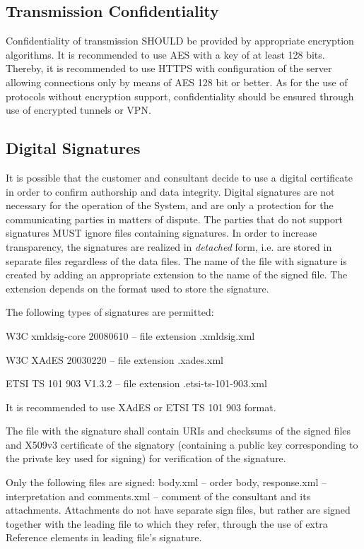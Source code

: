 \documentclass[a4paper]{article}
\begin{document}
\subsection{Transmission Confidentiality}

Confidentiality of transmission SHOULD be provided by appropriate encryption algorithms. 
It is recommended to use AES with a key of at least 128 bits. Thereby, it is recommended 
to use HTTPS with configuration of the server allowing connections only by means of AES 128 
bit or better. As for the use of protocols without encryption support, confidentiality 
should be ensured through use of encrypted tunnels or VPN.

\subsection{Digital Signatures}
\label{sec:sig}

It is possible that the customer and consultant decide to use a digital certificate in order 
to confirm authorship and data integrity. Digital signatures are not necessary for the operation 
of the System, and are only a protection for the communicating parties in matters of dispute. 
The parties that do not support signatures MUST ignore files containing signatures. In order 
to increase transparency, the signatures are realized in \emph{detached} form, i.e. are stored 
in separate files regardless of the data files. The name of the file with signature is created 
by adding an appropriate extension to the name of the signed file. The extension depends on 
the format used to store the signature.

The following types of signatures are permitted:
\begin{description}
\item W3C xmldsig-core 20080610 – file extension .xmldsig.xml
\item W3C XAdES 20030220 – file extension .xades.xml
\item ETSI TS 101 903 V1.3.2 – file extension .etsi-ts-101-903.xml      
\end{description}

It is recommended to use XAdES or ETSI TS 101 903 format.

The file with the signature shall contain URIs and checksums of the signed files and 
X509v3 certificate of the signatory (containing a public key corresponding to the private key 
used for signing) for verification of the signature.

Only the following files are signed: body.xml – order body, response.xml – interpretation 
and comments.xml – comment of the consultant and its attachments. Attachments do not have 
separate sign files, but rather are signed together with the leading file to which they 
refer, through the use of extra Reference elements in leading file's signature.
\end{document}
